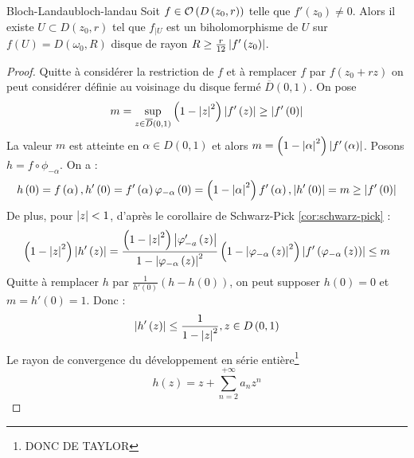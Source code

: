 \documentclass{cours}
\begin{document}
\begin{théorème}{Bloch-Landau}{bloch-landau}
    Soit $f \in \mathcal{O}\left(D\left(z_{0}, r\right)\right)$ telle que $f'\left(z_{0}\right) \neq 0$. Alors il existe $U \subset D\left(z_{0}, r\right)$ tel que $f_{\mid U}$ est un biholomorphisme de $U$ sur $f\left(U\right) = D\left(\omega_{0}, R\right)$ disque de rayon $R \geq \frac{r}{12}\left|f'\left(z_{0}\right)\right|$.
\end{théorème}
\begin{proof}
    Quitte à considérer la restriction de $f$ et à remplacer $f$ par $f\left(z_{0} + rz\right)$ on peut considérer définie au voisinage du disque fermé $\overline{D}\left(0, 1\right)$. On pose
    \begin{equation*}
        m = \sup_{z \in \overline{D}\left(0, 1\right)}\left(1 - \left|z\right|^{2}\right)\left|f'\left(z\right)\right| \geq \left|f'\left(0\right)\right|
    \end{equation*}
    La valeur $m$ est atteinte en $\alpha \in D\left(0, 1\right)$ et alors $m = \left(1 - \left|\alpha\right|^{2}\right)\left|f'\left(\alpha\right)\right|$. Posons $h = f\circ\phi_{-\alpha}$. On a : 
    \begin{equation*}
        h\left(0\right) = f\left(\alpha\right), h'\left(0\right) = f'\left(\alpha\right)\varphi_{-\alpha}\left(0\right) = \left(1 - \left|\alpha\right|^{2}\right)f'\left(\alpha\right), \left|h'\left(0\right)\right| = m \geq \left|f'\left(0\right)\right|
    \end{equation*}
    De plus, pour $\left|z\right| < 1$, d'après le corollaire de Schwarz-Pick \ref{cor:schwarz-pick} : 
    \begin{equation*}
        \left(1-\left|z\right|^{2}\right)\left|h'\left(z\right)\right| = \frac{\left(1 - \left|z\right|^{2}\right)\left|\varphi_{-a}'\left(z\right)\right|}{1 - \left|\varphi_{-\alpha}\left(z\right)\right|^{2}}\left(1 - \left|\varphi_{-\alpha}\left(z\right)\right|^{2}\right)\left|f'\left(\varphi_{-\alpha}\left(z\right)\right)\right| \leq m
    \end{equation*}
    Quitte à remplacer $h$ par $\frac{1}{h'\left(0\right)}\left(h-h\left(0\right)\right)$, on peut supposer $h\left(0\right) = 0$ et $m = h'\left(0\right) = 1$. Donc : 
    \begin{equation*}
        \left|h'\left(z\right)\right| \leq \frac{1}{1 - \left|z\right|^{2}}, z \in D\left(0, 1\right)
    \end{equation*}
    Le rayon de convergence du développement en série entière\footnote{DONC DE TAYLOR}
    \begin{equation*}
        h\left(z\right) = z + \sum_{n = 2}^{+ \infty}a_{n}z^{n}
    \end{equation*}

\end{proof}
\end{document}
